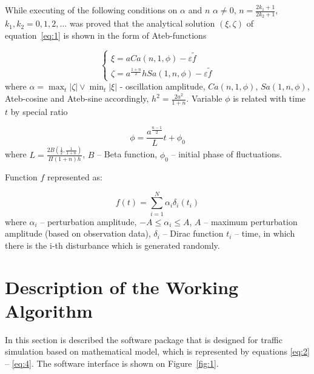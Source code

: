 \documentclass[runningheads,a4paper]{llncs}
\begin{document}
While executing of  the following conditions on $\alpha$ and $n$ $\alpha \neq 0$, $n = \frac{2k_1 + 1}{2k_2 + 1}$, $k_1, k_2 = 0, 1, 2, \ldots$ was proved that the analytical solution $(\xi, \zeta)$ of equation~\ref{eq:1} is shown in the form of Ateb-functions

\begin{equation} \label{eq:2}
\left\{
\begin{array}{ll}
\xi = aCa(n, 1, \phi) - \varepsilon \widetilde{f} \\
\zeta = a ^ {\frac{1+n}{2}} hSa (1, n, \phi) - \varepsilon \widetilde{f}
\end{array}
\right.
\end{equation}
where $\alpha = \max_{t} | \zeta | \vee \min_{t} | \xi |$ - oscillation amplitude, $Ca(n,1,\phi)$, $Sa(1,n,\phi)$, Ateb-cosine and Ateb-sine accordingly, $h^2 = \frac{2a^2}{1+n}$. Variable $\phi$ is related with time $t$ by special ratio

\begin{equation} \label{eq:3}
\phi = \frac{a^{\frac{n-1}{2}}}{L}t + \phi_0
\end{equation}
where $L = \frac{2B(\frac{1}{2}, \frac{1}{1+n})}{\Pi(1+n)h}$, $B$ -- Beta function, $\phi_0$ -- initial phase of fluctuations.

Function $f$ represented as:

\begin{equation} \label{eq:4}
f(t) = \sum _{i=1} ^N \alpha _i \delta _i (t_i)
\end{equation}
where $\alpha _i$ -- perturbation amplitude, $-A \le \alpha_i \le A$, $A$ -- maximum perturbation amplitude (based on observation data), $\delta _i$ -- Dirac function $t_i$ -- time, in which there is the i-th disturbance which is generated randomly.

\section{Description of the Working Algorithm}

In this section is described the software package that is designed for traffic simulation based on mathematical model, which is represented by equations \ref{eq:2} -- \ref{eq:4}. The software interface is shown on Figure~\ref{fig:1}. 
\end{document}

